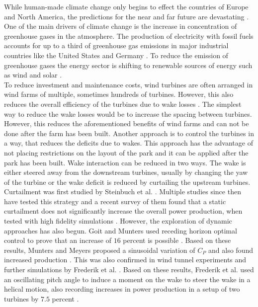 While human-made climate change only begins to effect the countries of Europe and North America, the predictions for the near and far future are devastating \cite{hoegh-guldberg_impacts_2019}. One of the main drivers of climate change is the increase in concentration of greenhouse gases in the atmosphere. The production of electricity with fossil fuels accounts for up to a third of greenhouse gas emissions in major industrial countries like the United States \cite{hockstad_inventory_2018} and Germany \cite{ortl_entwicklung_2020}. To reduce the emission of greenhouse gases the energy sector is shifting to renewable sources of energy such as wind and solar \cite{international_energy_agency_global_2020}.\\
To reduce investment and maintenance costs, wind turbines are often arranged in wind farms of multiple, sometimes hundreds of turbines. However, this also reduces the overall efficiency of the turbines due to wake losses \cite{nilsson_large-eddy_2015}. The simplest way to reduce the wake losses would be to increase the spacing between turbines. However, this reduces the aforementioned benefits of wind farms and can not be done after the farm has been built. Another approach is to control the turbines in a way, that reduces the deficits due to wakes. This approach has the advantage of not placing restrictions on the layout of the park and it can be applied after the park has been built. Wake interaction can be reduced in two ways. The wake is either steered away from the downstream turbines, usually by changing the yaw of the turbine or the wake deficit is reduced by curtailing the upstream turbines. Curtailment was first studied by Steinbuch et al. \cite{steinbuch_optimal_1988}. Multiple studies since then have tested this strategy and a recent survey of them found that a static curtailment does not significantly increase the overall power production, when tested with high fidelity simulations \cite{kheirabadi_quantitative_2019}. However, the exploration of dynamic approaches has also begun. Goit and Munters used receding horizon optimal control to prove that an increase of $16$ percent is possible \cite{goit_optimal_2015}. Based on these results, Munters and Meyers proposed a sinusoidal variation of $C_P$ and also found increased production \cite{munters_towards_2018}. This was also confirmed in wind tunnel experiments and further simulations by Frederik et al. \cite{frederik_periodic_2020}. Based on these results, Frederik et al. used an oscillating pitch angle to induce a moment on the wake to steer the wake in a helical motion, also recording increases in power production in a setup of two turbines by $7.5$ percent \cite{frederik_helix_2020}. \\
